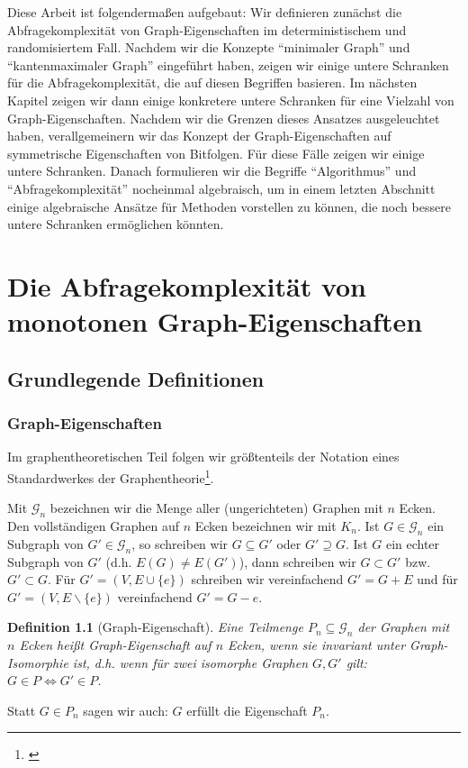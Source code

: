 \documentclass[10pt,a4paper, footheight=1mm]{scrreprt}
\newtheorem{definition}{Definition}
\theoremstyle{definition}
\begin{document}
Diese Arbeit ist folgendermaßen aufgebaut:
Wir definieren zunächst die Abfragekomplexität
von Graph-Eigenschaften im deterministischem und
randomisiertem Fall. Nachdem wir die Konzepte
"`minimaler Graph"' und "`kantenmaximaler Graph"'
eingeführt haben, zeigen wir einige untere Schranken
für die Abfragekomplexität, die auf diesen Begriffen
basieren. Im nächsten Kapitel zeigen wir dann einige
konkretere untere Schranken für eine Vielzahl von
Graph-Eigenschaften. Nachdem wir die Grenzen 
dieses Ansatzes ausgeleuchtet haben, verallgemeinern
wir das Konzept der Graph-Eigenschaften auf 
symmetrische Eigenschaften von Bitfolgen. Für
diese Fälle zeigen wir einige untere Schranken.
Danach formulieren wir die Begriffe "`Algorithmus"'
und "`Abfragekomplexität"' nocheinmal algebraisch, um
in einem letzten Abschnitt
einige algebraische Ansätze für Methoden vorstellen zu
können, die noch bessere untere Schranken ermöglichen könnten.

\chapter{Die Abfragekomplexität von monotonen Graph-Eigenschaften}
\section{Grundlegende Definitionen}
\subsection{Graph-Eigenschaften}
Im graphentheoretischen Teil folgen wir größtenteils
der Notation eines Standardwerkes der Graphentheorie\footnote{\cite{diestel}}.

Mit $\mathcal{G}_n$ bezeichnen wir die Menge aller
(ungerichteten) Graphen mit $n$ Ecken.
Den vollständigen Graphen auf $n$ Ecken bezeichnen wir
mit $K_n$.
Ist $G \in \mathcal{G}_n$ ein Subgraph von $G' \in \mathcal{G}_n$,
so schreiben wir $G \subseteq G'$ oder $G' \supseteq G$. Ist $G$ ein
echter Subgraph von $G'$ (d.h. $E(G) \neq E(G')$), dann schreiben
wir $G \subset G'$ bzw. $G' \subset G$.
Für $G' = (V, E \cup \{e\})$ schreiben wir vereinfachend
$G' = G + E$ und für $G' = (V, E \backslash \{e\})$ vereinfachend
$G' = G - e$.


\begin{definition}[Graph-Eigenschaft]
Eine Teilmenge $P_n \subseteq \mathcal{G}_n$ der Graphen mit
$n$ Ecken heißt \emph{Graph-Eigenschaft auf $n$ Ecken},
wenn sie invariant unter Graph-Isomorphie ist,
d.h. wenn für zwei isomorphe Graphen $G, G'$ gilt:
$G \in P \iff G' \in P$.
\end{definition}
Statt $G \in P_n$ sagen wir auch: $G$ erfüllt die Eigenschaft $P_n$.
\end{document}
